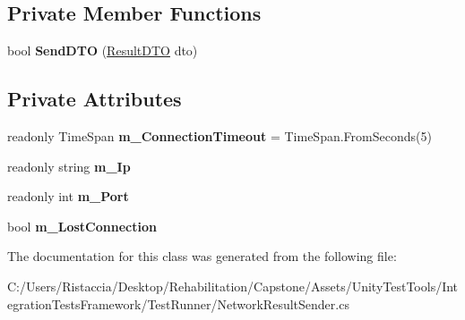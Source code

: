 \subsection*{Private Member Functions}
\begin{DoxyCompactItemize}
\item 
\mbox{\label{class_unity_test_1_1_network_result_sender_a85480377ac331e13f9cf37c42c4fff06}} 
bool {\bfseries Send\+D\+TO} (\hyperlink{class_unity_test_1_1_result_d_t_o}{Result\+D\+TO} dto)
\end{DoxyCompactItemize}
\subsection*{Private Attributes}
\begin{DoxyCompactItemize}
\item 
\mbox{\label{class_unity_test_1_1_network_result_sender_a9353ffcb74fd6cde21e363bf048378fe}} 
readonly Time\+Span {\bfseries m\+\_\+\+Connection\+Timeout} = Time\+Span.\+From\+Seconds(5)
\item 
\mbox{\label{class_unity_test_1_1_network_result_sender_afc5ef8e031d5533add35a8083be0c6a1}} 
readonly string {\bfseries m\+\_\+\+Ip}
\item 
\mbox{\label{class_unity_test_1_1_network_result_sender_abe6afbcfc2ed53ac7b8e5804fa391bb2}} 
readonly int {\bfseries m\+\_\+\+Port}
\item 
\mbox{\label{class_unity_test_1_1_network_result_sender_ac7fdbd1d228a5bcd6fb90871d26fd584}} 
bool {\bfseries m\+\_\+\+Lost\+Connection}
\end{DoxyCompactItemize}


The documentation for this class was generated from the following file\+:\begin{DoxyCompactItemize}
\item 
C\+:/\+Users/\+Ristaccia/\+Desktop/\+Rehabilitation/\+Capstone/\+Assets/\+Unity\+Test\+Tools/\+Integration\+Tests\+Framework/\+Test\+Runner/Network\+Result\+Sender.\+cs\end{DoxyCompactItemize}

